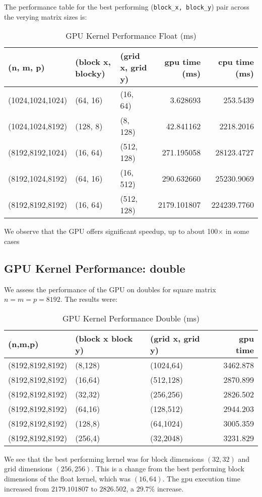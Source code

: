 \documentclass{article}
\begin{document}
\noindent The performance table for the best performing (\texttt{block\_x, block\_y}) pair 
across the verying matrix sizes is:
\begin{table}[H]
    \centering
    \caption{GPU Kernel Performance Float (ms)}
    \fontsize{12}{14}\selectfont
    \begin{tabular}[t]{lllrr}
    \toprule
    (n, m, p) & (block x, blocky) & (grid x, grid y) & gpu time (ms) & cpu time (ms)\\
    \midrule
    (1024,1024,1024) & (64, 16) & (16, 64) & 3.628693 & 253.5439\\
    (1024,1024,8192) & (128, 8) & (8, 128) & 42.841162 & 2218.2016\\
    (8192,8192,1024) & (16, 64) & (512, 128) & 271.195058 & 28123.4727\\
    (8192,1024,8192) & (64, 16) & (16, 512) & 290.632660 & 25230.9069\\
    (8192,8192,8192) & (16, 64) & (512, 128) & 2179.101807 & 224239.7760\\
    \bottomrule
    \end{tabular}
\end{table}
\noindent We observe that the GPU offers significant speedup, up to about 100$\times$ in some cases

\subsection{GPU Kernel Performance: double}
We assess the performance of the GPU on doubles for square matrix $n=m=p=8192$. 
The results were:
\begin{table}[H]
    \centering
    \caption{GPU Kernel Performance Double (ms)}
    \fontsize{12}{14}\selectfont
    \begin{tabular}[t]{lllr}
    \toprule
    (n,m,p) & (block x block y) & (grid x, grid y) & gpu time\\
    \midrule
    (8192,8192,8192) & (8,128) & (1024,64) & 3462.878\\
    (8192,8192,8192) & (16,64) & (512,128) & 2870.899\\
    (8192,8192,8192) & (32,32) & (256,256) & 2826.502\\
    (8192,8192,8192) & (64,16) & (128,512) & 2944.203\\
    (8192,8192,8192) & (128,8) & (64,1024) & 3005.359\\
    (8192,8192,8192) & (256,4) & (32,2048) & 3231.829\\
    \bottomrule
    \end{tabular}
\end{table}
\noindent We see that the best performing kernel was for block dimensions $(32,32)$ and grid dimensions $(256,256)$.
This is a change from the best performing block dimensions of the float kernel, which was $(16,64)$. The 
gpu execution time increased from $2179.101807$ to $2826.502$, a $29.7\%$ increase.
\end{document}
